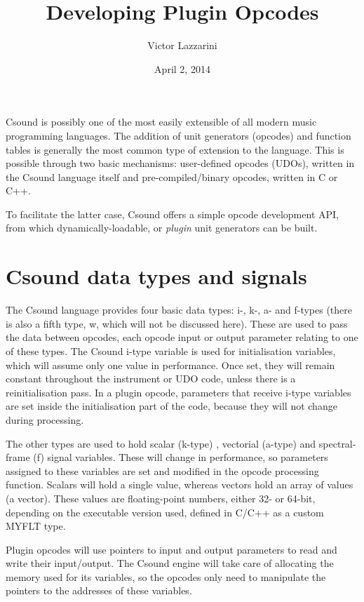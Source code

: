 \documentclass[11pt]{article}
\begin{document}
\title{Developing Plugin Opcodes}
\author{Victor Lazzarini}
\date{April 2, 2014}
\maketitle


Csound is possibly one of the most easily extensible of all modern music programming languages. The addition of unit generators (opcodes) and function tables is generally the most common type of extension to the language. This is possible through two basic mechanisms: user-defined opcodes (UDOs), written in the Csound language itself and pre-compiled/binary opcodes, written in C or C++.  

To facilitate the latter case, Csound offers a simple opcode development API, from which dynamically-loadable, or \emph{plugin} unit generators can be built. 

\section{ Csound data types and signals}

The Csound language provides four basic data types: i-, k-, a- and f-types  (there is also a fifth type, w, which will not be discussed here). These are used to pass the data between opcodes, each opcode input or output parameter relating to one of these types. The Csound i-type variable is used for initialisation variables, which will assume only one value in performance. Once set, they will remain constant throughout the instrument or UDO code, unless there is a reinitialisation pass. In a plugin opcode, parameters that receive i-type variables are set inside the initialisation part of the code, because they will not change during processing.

The other types are used to hold scalar (k-type) , vectorial (a-type)  and spectral-frame (f) signal variables. These will change in performance, so parameters assigned to these variables are set and modified in the opcode processing function. Scalars will hold a single value, whereas vectors hold an array of values (a vector). These values are floating-point numbers, either 32- or 64-bit, depending on the executable version used, defined in C/C++ as a custom MYFLT type. 

Plugin opcodes will use pointers to input and output parameters to read and write their input/output. The Csound engine will take care of allocating the memory used for its variables, so the opcodes only need to manipulate the pointers to the addresses of these variables. 
\end{document}

